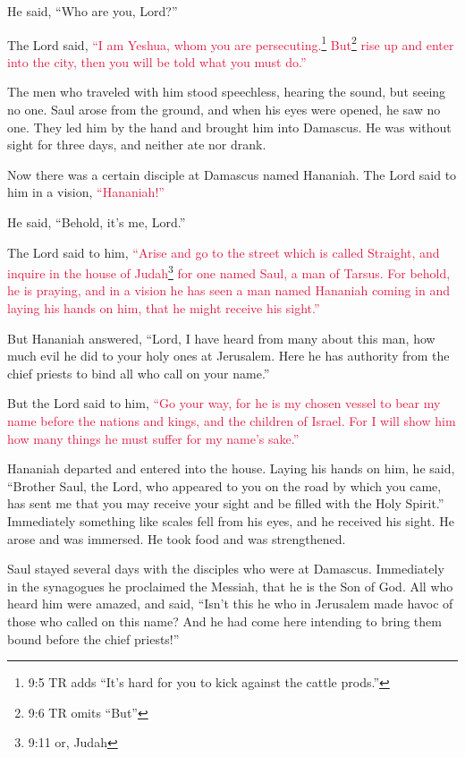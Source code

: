 \myverse{}He said, “Who are you, Lord?”

The Lord said,
\textcolor{crimson}{“I am Yeshua, whom you are persecuting.}\footnote{9:5 TR adds “It’s hard for you to kick against the cattle prods.”}
\myverse{}\textcolor{crimson}{But}\footnote{9:6 TR omits “But”
}
\textcolor{crimson}{rise up and enter into the city, then you will be told what you must do.”}

\myverse{}The men who traveled with him stood speechless, hearing the sound,
but seeing no one.
\myverse{}Saul arose from the ground, and when his eyes were opened, he saw no one. They
led him by the hand and brought him into Damascus.
\myverse{}He was without sight for three days, and neither ate nor drank.

\myverse{}Now there was a certain disciple at Damascus named Hananiah.
The Lord said to him in a vision,
\textcolor{crimson}{“Hananiah!”}

He said, “Behold, it’s me, Lord.”

\myverse{}The Lord said to him,
\textcolor{crimson}{“Arise and go to the street which is called Straight, and inquire in the house of Judah}\footnote{9:11 or, Judah}
\textcolor{crimson}{for one named Saul, a man of Tarsus. For behold, he is praying,
}
\myverse{}\textcolor{crimson}{and in a vision he has seen a man named Hananiah coming in and laying
	his hands on him, that he might receive his sight.”}

\myverse{}But Hananiah answered, “Lord, I have heard from many about this
man, how much evil he did to your holy ones at Jerusalem.
\myverse{}Here he has authority from the chief priests to bind all who call on your
name.”

\myverse{}But the Lord said to him,
\textcolor{crimson}{“Go your way, for he is my chosen vessel to bear my name before the nations and kings, and the children
	of Israel.
}
\myverse{}\textcolor{crimson}{For I will show him how many things he must suffer for my name’s sake.”}

\myverse{}Hananiah departed and entered into the house. Laying his hands
on him, he said, “Brother Saul, the Lord, who appeared to you on the road by which you came, has sent
me that you may receive your sight and be filled with the Holy Spirit.”
\myverse{}Immediately something like scales fell from his eyes, and he received his
sight. He arose and was immersed.
\myverse{}He took food and was strengthened.

Saul stayed several days with the disciples who were at Damascus.
\myverse{}Immediately in the synagogues he proclaimed the Messiah, that he is the Son
of God.
\myverse{}All who heard him were amazed, and said, “Isn’t this he who in Jerusalem made
havoc of those who called on this name? And he had come here intending to bring them bound before the
chief priests!”

